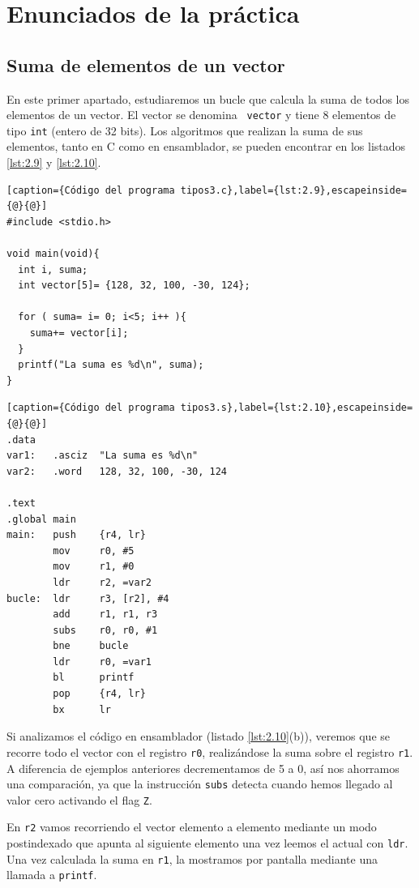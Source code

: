 \section{Enunciados de la práctica}


\subsection{Suma de elementos de un vector}

En este primer apartado, estudiaremos un bucle que calcula la suma de
todos los elementos de un vector. El vector se denomina {\tt
vector} y tiene 8 elementos de tipo {\tt int} (entero de 32 bits). Los algoritmos
que realizan la suma de sus elementos, tanto en C como en ensamblador, se
pueden encontrar en los listados \ref{lst:2.9} y \ref{lst:2.10}.

\begin{lstlisting}[caption={Código del programa tipos3.c},label={lst:2.9},escapeinside={@}{@}]
#include <stdio.h>

void main(void){
  int i, suma;
  int vector[5]= {128, 32, 100, -30, 124};

  for ( suma= i= 0; i<5; i++ ){
    suma+= vector[i];
  }
  printf("La suma es %d\n", suma);
}
\end{lstlisting}

\begin{lstlisting}[caption={Código del programa tipos3.s},label={lst:2.10},escapeinside={@}{@}]
.data
var1:   .asciz  "La suma es %d\n"
var2:   .word   128, 32, 100, -30, 124

.text
.global main
main:   push    {r4, lr}
        mov     r0, #5
        mov     r1, #0
        ldr     r2, =var2
bucle:  ldr     r3, [r2], #4
        add     r1, r1, r3
        subs    r0, r0, #1
        bne     bucle
        ldr     r0, =var1
        bl      printf
        pop     {r4, lr}
        bx      lr
\end{lstlisting}

Si analizamos el código en ensamblador (listado \ref{lst:2.10}(b)), veremos que se
recorre todo el vector con el registro {\tt r0}, realizándose la suma sobre el
registro {\tt r1}. A diferencia de ejemplos anteriores decrementamos de 5 a 0, así
nos ahorramos una comparación, ya que la instrucción {\tt subs} detecta cuando hemos
llegado al valor cero activando el flag {\tt Z}.

En {\tt r2} vamos recorriendo el vector elemento a elemento mediante un modo postindexado
que apunta al siguiente elemento una vez leemos el actual con {\tt ldr}. Una vez calculada
la suma en {\tt r1}, la mostramos por pantalla mediante una llamada a {\tt printf}.

